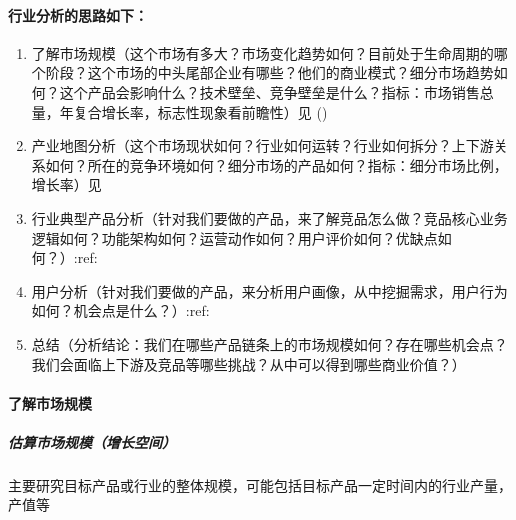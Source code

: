 \documentclass[letterpaper,11pt,english]{sphinxmanual}
\begin{document}
\paragraph{行业分析的思路如下：}
\label{\detokenize{chapter_knowledge/industry_analysis:id6}}\begin{enumerate}
%
\item {} 
了解市场规模（这个市场有多大？市场变化趋势如何？目前处于生命周期的哪个阶段？这个市场的中头尾部企业有哪些？他们的商业模式？细分市场趋势如何？这个产品会影响什么？技术壁垒、竞争壁垒是什么？指标：市场销售总量，年复合增长率，标志性现象看前瞻性）见
{\hyperref[\detokenize{chapter_knowledge/industry_analysis:market-size}]{}} ()

\item {} 
产业地图分析（这个市场现状如何？行业如何运转？行业如何拆分？上下游关系如何？所在的竞争环境如何？细分市场的产品如何？指标：细分市场比例，增长率）见

\item {} 
行业典型产品分析（针对我们要做的产品，来了解竞品怎么做？竞品核心业务逻辑如何？功能架构如何？运营动作如何？用户评价如何？优缺点如何？）:ref:

\item {} 
用户分析（针对我们要做的产品，来分析用户画像，从中挖掘需求，用户行为如何？机会点是什么？）:ref:

\item {} 
总结（分析结论：我们在哪些产品链条上的市场规模如何？存在哪些机会点？我们会面临上下游及竞品等哪些挑战？从中可以得到哪些商业价值？）

\end{enumerate}


\paragraph{了解市场规模}
\label{\detokenize{chapter_knowledge/industry_analysis:market-size}}\label{\detokenize{chapter_knowledge/industry_analysis:id7}}

\subparagraph{估算市场规模（增长空间）}
\label{\detokenize{chapter_knowledge/industry_analysis:id8}}
主要研究目标产品或行业的整体规模，可能包括目标产品一定时间内的行业产量，产值等
%
\begin{footnote}[429]\sphinxAtStartFootnote
{}
%
\end{footnote}
\end{document}
